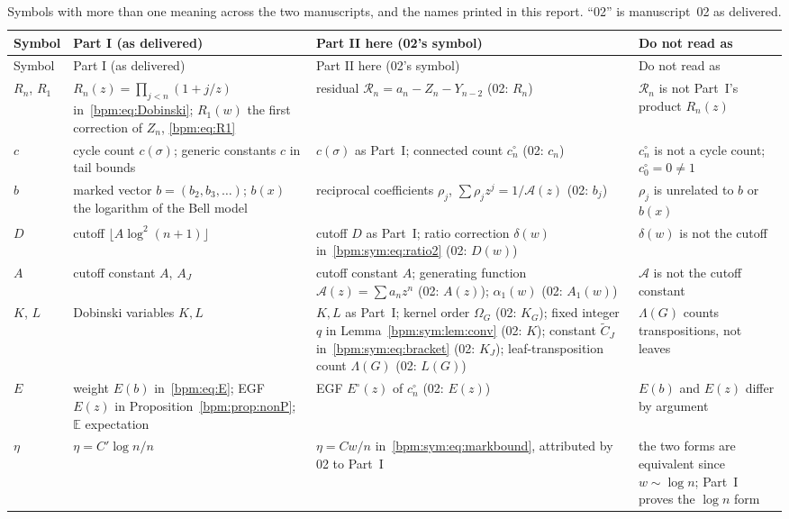 \documentclass[11pt,a4paper]{article}
\theoremstyle{remark}\newtheorem{remark}[theorem]{Remark}%
\newcommand{\E}{\mathbb E}\newcommand{\Pp}{\mathbb P}
\begin{document}
{\small
\setlength{\LTcapwidth}{\textwidth}
\begin{longtable}{>{\raggedright}p{}>{\raggedright}p{}>{\raggedright}p{}>{\raggedright\arraybackslash}p{}}
\caption{Symbols with more than one meaning across the two manuscripts, and
the names printed in this report. ``02'' is manuscript~02 as delivered.}
\label{bpm:tab:conventions}\\
\toprule
Symbol & Part I (as delivered) & Part II here (02's symbol) & Do not read as\\
\midrule\endfirsthead
\toprule
Symbol & Part I (as delivered) & Part II here (02's symbol) & Do not read as\\
\midrule\endhead
\bottomrule\endfoot
$R_n$, $R_1$ & $R_n(z)=\prod_{j<n}(1+j/z)$ in~\eqref{bpm:eq:Dobinski}; $R_1(w)$ the first correction of $Z_n$, \eqref{bpm:eq:R1} & residual $\mathcal R_n=a_n-Z_n-Y_{n-2}$ (02: $R_n$) & $\mathcal R_n$ is not Part~I's product $R_n(z)$\\
$c$ & cycle count $c(\sigma)$; generic constants $c$ in tail bounds & $c(\sigma)$ as Part~I; connected count $c^\circ_n$ (02: $c_n$) & $c^\circ_n$ is not a cycle count; $c^\circ_0=0\neq1$\\
$b$ & marked vector $b=(b_2,b_3,\ldots)$; $b(x)$ the logarithm of the Bell model & reciprocal coefficients $\rho_j$, $\sum\rho_jz^j=1/\mathcal A(z)$ (02: $b_j$) & $\rho_j$ is unrelated to $b$ or $b(x)$\\
$D$ & cutoff $\lfloor A\log^2(n+1)\rfloor$ & cutoff $D$ as Part~I; ratio correction $\delta(w)$ in~\eqref{bpm:sym:eq:ratio2} (02: $D(w)$) & $\delta(w)$ is not the cutoff\\
$A$ & cutoff constant $A$, $A_J$ & cutoff constant $A$; generating function $\mathcal A(z)=\sum a_nz^n$ (02: $A(z)$); $\alpha_1(w)$ (02: $A_1(w)$) & $\mathcal A$ is not the cutoff constant\\
$K$, $L$ & Dobinski variables $K,L$ & $K,L$ as Part~I; kernel order $\Omega_G$ (02: $K_G$); fixed integer $q$ in Lemma~\ref{bpm:sym:lem:conv} (02: $K$); constant $\widetilde C_J$ in~\eqref{bpm:sym:eq:bracket} (02: $K_J$); leaf-transposition count $\Lambda(G)$ (02: $L(G)$) & $\Lambda(G)$ counts transpositions, not leaves\\
$E$ & weight $E(b)$ in~\eqref{bpm:eq:E}; EGF $E(z)$ in Proposition~\ref{bpm:prop:nonP}; $\E$ expectation & EGF $E^\circ(z)$ of $c^\circ_n$ (02: $E(z)$) & $E(b)$ and $E(z)$ differ by argument\\
$\eta$ & $\eta=C'\log n/n$ & $\eta=Cw/n$ in~\eqref{bpm:sym:eq:markbound}, attributed by 02 to Part~I & the two forms are equivalent since $w\sim\log n$; Part~I proves the $\log n$ form\\

\end{longtable}}
\end{document}
